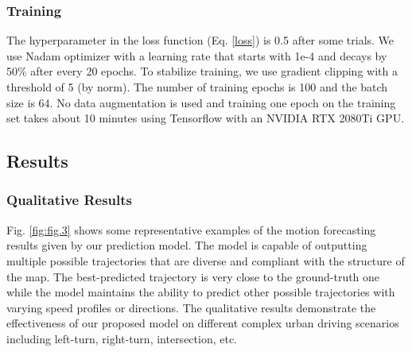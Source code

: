 \documentclass[letterpaper, 10 pt, conference]{ieeeconf}
\begin{document}
\subsubsection{Training}
The hyperparameter  in the loss function (Eq. \ref{loss}) is 0.5 after some trials. We use Nadam optimizer with a learning rate that starts with 1e-4 and decays by 50\% after every 20 epochs. To stabilize training, we use gradient clipping with a threshold of 5 (by norm). The number of training epochs is 100 and the batch size is 64. No data augmentation is used and training one epoch on the training set takes about 10 minutes using Tensorflow with an NVIDIA RTX 2080Ti GPU. 

\subsection{Results}
\subsubsection{Qualitative Results}

Fig. \ref{fig:fig.3} shows some representative examples of the motion forecasting results given by our prediction model. The model is capable of outputting multiple possible trajectories that are diverse and compliant with the structure of the map. The best-predicted trajectory is very close to the ground-truth one while the model maintains the ability to predict other possible trajectories with varying speed profiles or directions. The qualitative results demonstrate the effectiveness of our proposed model on different complex urban driving scenarios including left-turn, right-turn, intersection, etc. 
\end{document}
